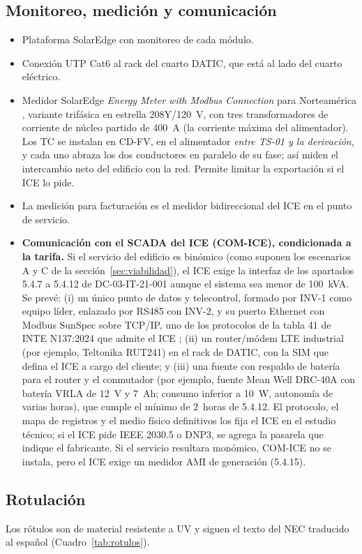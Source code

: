 \documentclass[12pt]{article}
\begin{document}
\subsection{Monitoreo, medición y comunicación}
\begin{itemize}
\item Plataforma SolarEdge con monitoreo de cada módulo.
\item Conexión UTP Cat6 al rack del cuarto DATIC, que está al lado del cuarto eléctrico.
\item Medidor SolarEdge \emph{Energy Meter with Modbus Connection} para Norteamérica \cite{seMeter}, variante trifásica en estrella 208Y/120~V, con tres transformadores de corriente de núcleo partido de 400~A (la corriente máxima del alimentador). Los TC se instalan en CD-FV, en el alimentador \emph{entre TS-01 y la derivación}, y cada uno abraza los dos conductores en paralelo de su fase; así miden el intercambio neto del edificio con la red. Permite limitar la exportación si el ICE lo pide.
\item La medición para facturación es el medidor bidireccional del ICE en el punto de servicio.
\item \textbf{Comunicación con el SCADA del ICE (COM-ICE), condicionada a la tarifa.} Si el servicio del edificio es binómico (como suponen los escenarios A y C de la sección~\ref{sec:viabilidad}), el ICE exige la interfaz de los apartados 5.4.7 a 5.4.12 de DC-03-IT-21-001 aunque el sistema sea menor de 100~kVA. Se prevé: (i) un único punto de datos y telecontrol, formado por INV-1 como equipo líder, enlazado por RS485 con INV-2, y su puerto Ethernet con Modbus SunSpec sobre TCP/IP, uno de los protocolos de la tabla 41 de INTE N137:2024 que admite el ICE \cite{seSunSpec}; (ii) un router/módem LTE industrial (por ejemplo, Teltonika RUT241) en el rack de DATIC, con la SIM que defina el ICE a cargo del cliente; y (iii) una fuente con respaldo de batería para el router y el conmutador (por ejemplo, fuente Mean Well DRC-40A con batería VRLA de 12~V y 7~Ah; consumo inferior a 10~W, autonomía de varias horas), que cumple el mínimo de 2~horas de 5.4.12. El protocolo, el mapa de registros y el medio físico definitivos los fija el ICE en el estudio técnico; si el ICE pide IEEE 2030.5 o DNP3, se agrega la pasarela que indique el fabricante. Si el servicio resultara monómico, COM-ICE no se instala, pero el ICE exige un medidor AMI de generación (5.4.15).
\end{itemize}

\subsection{Rotulación}
Los rótulos son de material resistente a UV y siguen el texto del NEC traducido al español (Cuadro~\ref{tab:rotulos}).
\end{document}
